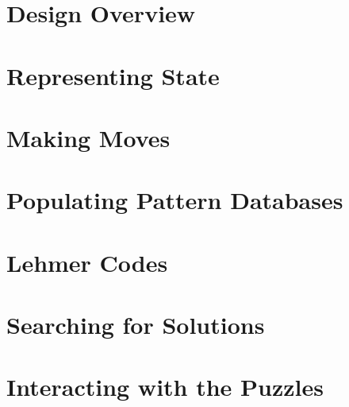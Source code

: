
\section{Design Overview}

\section{Representing State}

\section{Making Moves}

\section{Populating Pattern Databases}

\section{Lehmer Codes}

\section{Searching for Solutions}

\section{Interacting with the Puzzles}
